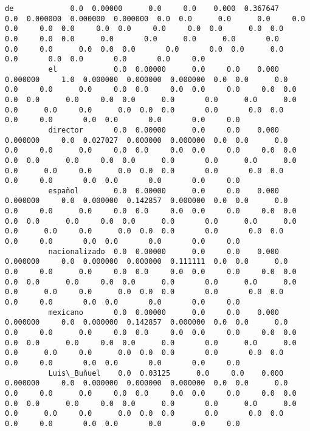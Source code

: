 \documentclass[11pt]{article}
\begin{document}
\begin{Verbatim}[commandchars=\\\{\}]
          de             0.0  0.00000      0.0     0.0    0.000  0.367647     0.0  0.000000  0.000000  0.000000  0.0  0.0      0.0      0.0     0.0      0.0     0.0  0.0     0.0  0.0     0.0     0.0  0.0      0.0  0.0      0.0     0.0  0.0      0.0       0.0      0.0      0.0       0.0      0.0     0.0      0.0  0.0  0.0       0.0       0.0  0.0      0.0     0.0       0.0  0.0       0.0       0.0     0.0   
          el             0.0  0.00000      0.0     0.0    0.000  0.000000     1.0  0.000000  0.000000  0.000000  0.0  0.0      0.0      0.0     0.0      0.0     0.0  0.0     0.0  0.0     0.0     0.0  0.0      0.0  0.0      0.0     0.0  0.0      0.0       0.0      0.0      0.0       0.0      0.0     0.0      0.0  0.0  0.0       0.0       0.0  0.0      0.0     0.0       0.0  0.0       0.0       0.0     0.0   
          director       0.0  0.00000      0.0     0.0    0.000  0.000000     0.0  0.027027  0.000000  0.000000  0.0  0.0      0.0      0.0     0.0      0.0     0.0  0.0     0.0  0.0     0.0     0.0  0.0      0.0  0.0      0.0     0.0  0.0      0.0       0.0      0.0      0.0       0.0      0.0     0.0      0.0  0.0  0.0       0.0       0.0  0.0      0.0     0.0       0.0  0.0       0.0       0.0     0.0   
          español        0.0  0.00000      0.0     0.0    0.000  0.000000     0.0  0.000000  0.142857  0.000000  0.0  0.0      0.0      0.0     0.0      0.0     0.0  0.0     0.0  0.0     0.0     0.0  0.0      0.0  0.0      0.0     0.0  0.0      0.0       0.0      0.0      0.0       0.0      0.0     0.0      0.0  0.0  0.0       0.0       0.0  0.0      0.0     0.0       0.0  0.0       0.0       0.0     0.0   
          nacionalizado  0.0  0.00000      0.0     0.0    0.000  0.000000     0.0  0.000000  0.000000  0.111111  0.0  0.0      0.0      0.0     0.0      0.0     0.0  0.0     0.0  0.0     0.0     0.0  0.0      0.0  0.0      0.0     0.0  0.0      0.0       0.0      0.0      0.0       0.0      0.0     0.0      0.0  0.0  0.0       0.0       0.0  0.0      0.0     0.0       0.0  0.0       0.0       0.0     0.0   
          mexicano       0.0  0.00000      0.0     0.0    0.000  0.000000     0.0  0.000000  0.142857  0.000000  0.0  0.0      0.0      0.0     0.0      0.0     0.0  0.0     0.0  0.0     0.0     0.0  0.0      0.0  0.0      0.0     0.0  0.0      0.0       0.0      0.0      0.0       0.0      0.0     0.0      0.0  0.0  0.0       0.0       0.0  0.0      0.0     0.0       0.0  0.0       0.0       0.0     0.0   
          Luis\_Buñuel    0.0  0.03125      0.0     0.0    0.000  0.000000     0.0  0.000000  0.000000  0.000000  0.0  0.0      0.0      0.0     0.0      0.0     0.0  0.0     0.0  0.0     0.0     0.0  0.0      0.0  0.0      0.0     0.0  0.0      0.0       0.0      0.0      0.0       0.0      0.0     0.0      0.0  0.0  0.0       0.0       0.0  0.0      0.0     0.0       0.0  0.0       0.0       0.0     0.0   

\end{Verbatim}
\end{document}
